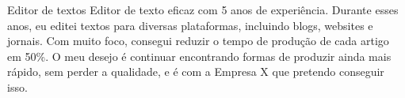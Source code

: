 \begin{commentA} \vspace{0.3cm} \noindent 
Editor de textos
Editor de texto eficaz com 5 anos de experiência. Durante esses anos, eu editei textos para diversas plataformas, incluindo blogs, websites e jornais. Com muito foco, consegui reduzir o tempo de produção de cada artigo em 50\%. O meu desejo é continuar encontrando formas de produzir ainda mais rápido, sem perder a qualidade, e é com a Empresa X que pretendo conseguir isso.
\par \vspace{0.1cm} \end{commentA}